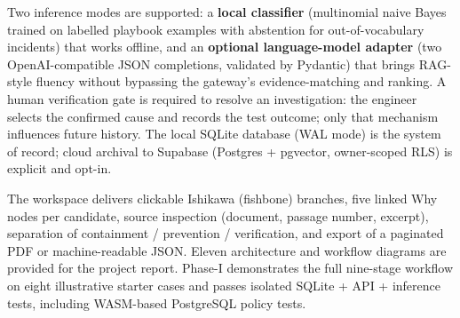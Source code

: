 \documentclass[12pt,a4paper,oneside]{report}
\begin{document}
Two inference modes are supported: a \textbf{local classifier} (multinomial naive Bayes trained on labelled playbook examples with abstention for out-of-vocabulary incidents) that works offline, and an \textbf{optional language-model adapter} (two OpenAI-compatible JSON completions, validated by Pydantic) that brings RAG-style fluency without bypassing the gateway's evidence-matching and ranking. A human verification gate is required to resolve an investigation: the engineer selects the confirmed cause and records the test outcome; only that mechanism influences future history. The local SQLite database (WAL mode) is the system of record; cloud archival to Supabase (Postgres + pgvector, owner-scoped RLS) is explicit and opt-in.

The workspace delivers clickable Ishikawa (fishbone) branches, five linked Why nodes per candidate, source inspection (document, passage number, excerpt), separation of containment / prevention / verification, and export of a paginated PDF or machine-readable JSON. Eleven architecture and workflow diagrams are provided for the project report. Phase-I demonstrates the full nine-stage workflow on eight illustrative starter cases and passes isolated SQLite + API + inference tests, including WASM-based PostgreSQL policy tests.

\tableofcontents
\listoffigures
{}
\listoftables
{}
\end{document}
